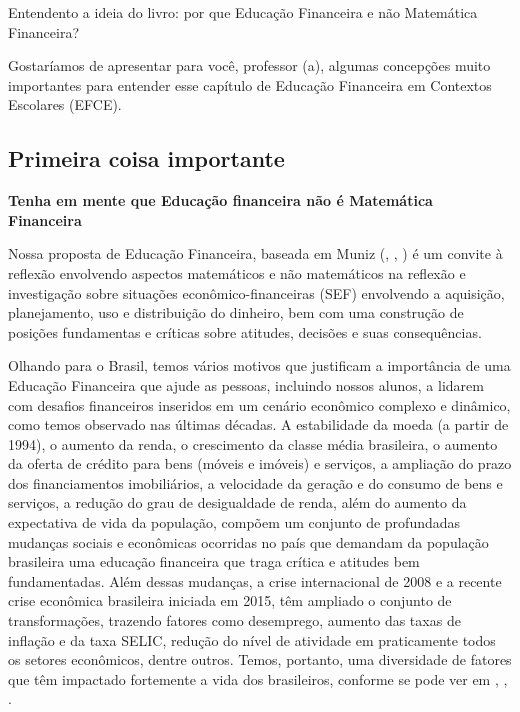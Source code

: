 \mainmatter

\begin{apresentacao}{Entendento a ideia do livro: por que Educação Financeira e não Matemática Financeira?}

Gostaríamos de apresentar para você, professor (a), algumas concepções muito importantes para entender esse capítulo de Educação Financeira em Contextos Escolares (EFCE). 

\subsection{Primeira coisa importante}
\begin{center}
\textbf{Tenha em mente que Educação financeira não é Matemática Financeira}
\end{center}
Nossa proposta de Educação Financeira, baseada em Muniz (\citeyear{muniz2016a}, \citeyear{muniz2016b}, \citeyear{muniz2016c}) é um convite à reflexão envolvendo aspectos matemáticos e não matemáticos na reflexão e investigação sobre situações econômico-financeiras (SEF) envolvendo a aquisição, planejamento, uso e distribuição do dinheiro, bem com uma construção de posições fundamentas e críticas sobre atitudes, decisões e suas consequências. 

Olhando para o Brasil, temos vários motivos que justificam a importância de uma Educação Financeira que ajude as pessoas, incluindo nossos alunos, a lidarem com desafios financeiros inseridos em um cenário econômico complexo e dinâmico, como temos observado nas últimas décadas. A estabilidade da moeda (a partir de 1994), o aumento da renda, o crescimento da classe média brasileira, o aumento da oferta de crédito para bens (móveis e imóveis) e serviços, a ampliação do prazo dos financiamentos imobiliários, a velocidade da geração e do consumo de bens e serviços, a redução do grau de desigualdade de renda, além do aumento da expectativa de vida da população, compõem um conjunto de profundadas mudanças sociais e econômicas ocorridas no país que demandam da população brasileira uma educação financeira que traga crítica e atitudes bem fundamentadas. Além dessas mudanças, a crise internacional de 2008 e a recente crise econômica brasileira iniciada em 2015, têm ampliado o conjunto de transformações, trazendo fatores como desemprego, aumento das taxas de inflação e da taxa SELIC, redução do nível de atividade em praticamente todos os setores econômicos, dentre outros. Temos, portanto, uma diversidade de fatores que têm impactado fortemente a vida dos brasileiros, conforme se pode ver em \cite{neri2010}, \cite{PNAD2010}, \cite{leitao2011}.


\end{apresentacao}
